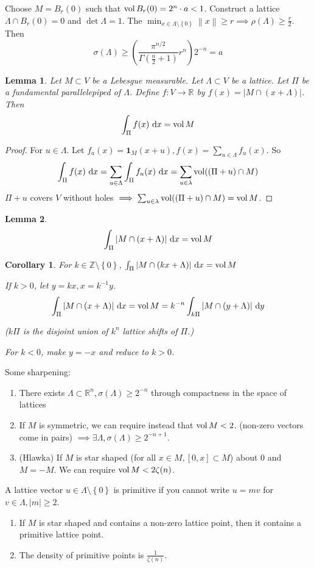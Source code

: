 \documentclass{report}
\newcommand{\R}{\mathbb{R}}
\newcommand{\Z}{\mathbb{Z}}
\newcommand{\idf}{\ \mathrm{d}}
\newcommand{\norm}[1]{\left\| #1 \right\|}
\newcommand{\set}[1]{\left\{ #1 \right\}}
\newtheorem{corollary}{Corollary}[section]
\newtheorem{lemma}{Lemma}[section]
\theoremstyle{definition}
\theoremstyle{remark}
\numberwithin{equation}{section}
\begin{document}
Choose $M = B_r(0)$ such that  $\operatorname{vol} B_r(0) = 2^n \cdot a < 1$. Construct a lattice $\Lambda \cap B_r(0) = 0$ and $\det \Lambda = 1$. The $\min_{x \in \Lambda \setminus \set{0}} \norm{x} \geq r \implies \rho(\Lambda) \geq \frac{r}{2}$. Then \[
    \sigma(\Lambda) \geq \left(\frac{\pi^{n/2}}{\Gamma(\frac{n}{2}+1)}r^n\right)2^{-n} = a\]
\begin{lemma}
    Let $M \subset V$ be a Lebesgue measurable. Let $\Lambda \subset V$ be a lattice. Let $\Pi$ be a fundamental parallelepiped of $\Lambda$. Define $f: V \to \R$ by $f(x) = |M \cap (x + \Lambda)|$. Then \[\int_\Pi f(x) \idf x = \vol M\]
\end{lemma}
\begin{proof}
    For $u \in \Lambda$. Let $f_a(x) = \mathbf{1}_{M}(x+u), f(x) = \sum_{u\in \Lambda} f_u(x)$. So \[
    \int_\Pi f(x) \idf x = \sum_{u \in \Lambda} \int_\Pi f_u(x) \idf x = \sum_{u \in \lambda} \vol ((\Pi + u) \cap M)    
    \]
    $\Pi + u$ covers $V$ without holes $\implies \sum_{u \in \lambda} \operatorname{vol} ((\Pi + u) \cap M) = \operatorname{vol} M$.
\end{proof}
\begin{lemma}
    \[\int_\Pi |M \cap (x + \Lambda)| \idf x = \vol M\]
\end{lemma}
\begin{corollary}
    For $k \in \Z \setminus \set{0}$, $\int_\Pi |M \cap (kx + \Lambda)| \idf x = \vol M$

    If $k > 0$, let $y = kx, x = k^{-1}y$. \[\int_\Pi |M \cap (x + \Lambda)| \idf x = \vol M = k^{-n}\int_{k\Pi} |M \cap (y + \Lambda)| \idf y\]

    ($k\Pi$ is the disjoint union of $k^n$ lattice shifts of $\Pi$.)

    For $k < 0$, make $y = -x$ and reduce to $k > 0$.
\end{corollary}

Some sharpening: \begin{enumerate}
    \item There exists $\Lambda \subset \R^n, \sigma (\Lambda) \geq 2^{-n}$ through compactness in the space of lattices
    \item If $M$ is symmetric, we can require instead that $\operatorname{vol} M < 2$. (non-zero vectors come in pairs) $\implies \exists \Lambda, \sigma (\Lambda) \geq 2^{-n+1}$.
    \item (Hlawka) If $M$ is star shaped (for all $x \in M, [0, x] \subset M$) about $0$ and $M = -M$. We can require $\operatorname{vol} M < 2 \zeta(n)$.
\end{enumerate}
A lattice vector $u \in \Lambda \setminus \set{0}$ is primitive if you cannot write $u = mv$ for $v \in \Lambda, |m| \geq 2$.
\begin{enumerate}
    \item If $M$ is star shaped and contains a non-zero lattice point, then it contains a primitive lattice point.
    \item The density of primitive points is $\frac{1}{\zeta(n)}$.
\end{enumerate}
\end{document}
